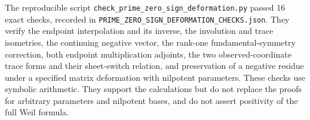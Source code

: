 \documentclass[
  10pt,
  a4paper,
]{article}
\begin{document}
The reproducible script
\texttt{check\_\allowbreak{}prime\_\allowbreak{}zero\_\allowbreak{}sign\_\allowbreak{}deformation.\allowbreak{}py} passed 16 exact
checks, recorded in
\texttt{PRIME\_\allowbreak{}ZERO\_\allowbreak{}SIGN\_\allowbreak{}DEFORMATION\_\allowbreak{}CHECKS.\allowbreak{}json}. They verify the
endpoint interpolation and its inverse, the involution and trace
isometries, the continuing negative vector, the rank-one
fundamental-symmetry correction, both endpoint multiplication adjoints,
the two observed-coordinate trace forms and their sheet-switch relation,
and preservation of a negative residue under a specified matrix
deformation with nilpotent parameters. These checks use symbolic
arithmetic. They support the calculations but do not replace the proofs
for arbitrary parameters and nilpotent bases, and do not assert
positivity of the full Weil formula.
\end{document}
